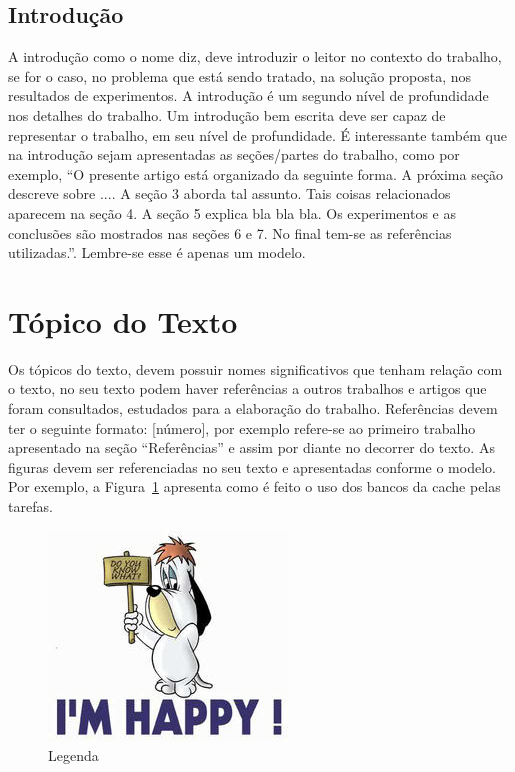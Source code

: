 \documentclass[times, 10pt,twocolumn]{article}
\begin{document}
\begin{savenotes}
\section{Introdução} \label{sec_introducao}

A introdução como o nome diz, deve introduzir o leitor no contexto do trabalho, se for o caso, no problema que está sendo tratado, na solução proposta, nos resultados de experimentos. A introdução é um segundo nível de profundidade nos detalhes do trabalho. Um introdução bem escrita deve ser capaz de representar o trabalho, em seu nível de profundidade. É interessante também que na introdução sejam apresentadas as seções/partes do trabalho, como por exemplo,  “O presente artigo está organizado da seguinte forma. A próxima seção descreve sobre .... A seção 3 aborda tal assunto. Tais coisas relacionados aparecem na seção 4. A seção 5 explica bla bla bla. Os experimentos e as conclusões são mostrados nas seções 6 e 7. No final tem-se as referências utilizadas.”. Lembre-se esse é apenas um modelo.

\end{savenotes}

\section{Tópico do Texto} \label{sec_topico_texto}
Os tópicos do texto, devem possuir nomes significativos que tenham relação com o texto, no seu texto podem haver referências a outros trabalhos e artigos que foram consultados, estudados para a elaboração do trabalho. Referências devem ter o seguinte formato: [número], por exemplo \cite{Codishetal2000} refere-se ao primeiro trabalho apresentado na seção “Referências” e assim por diante no decorrer do texto.
As figuras devem ser referenciadas no seu texto e apresentadas conforme o modelo. Por exemplo, a Figura~{\ref{fig:figura-001}} apresenta como é feito o uso dos bancos da cache pelas tarefas.

\begin{figure}[!htb]
    \centering
    \includegraphics{figuras/droopy.jpg}
    \caption{Legenda}
    \label{fig:figura-001}
\end{figure}
\end{document}
